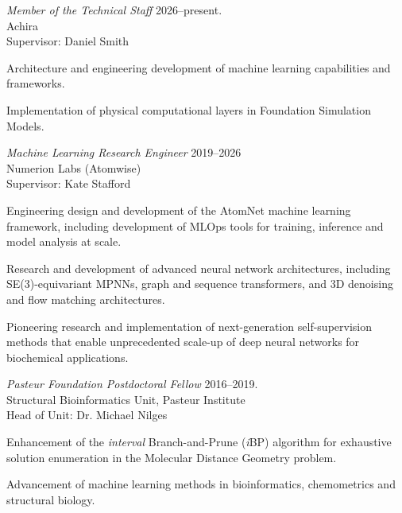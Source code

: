 \documentclass[letterpaper]{article}
\renewenvironment{itemize}{
  \begin{list}{}{
    \setlength{\leftmargin}{1.5em}
  }
}{
  \end{list}
}
\begin{document}
\begin{itemize}
\setlength{\itemsep}{16pt}
\item{
  {\it Member of the Technical Staff}
  \hfill 2026--present. \\
  Achira \\
  Supervisor: Daniel Smith \\
  \begin{enumerate*}
    \item Architecture and engineering development of machine learning
    capabilities and frameworks.
    \item Implementation of physical computational layers in Foundation
    Simulation Models.
  \end{enumerate*}
}

\pagebreak
\item{
  {\it Machine Learning Research Engineer}
  \hfill 2019--2026 \\
  Numerion Labs (Atomwise) \\
  Supervisor: Kate Stafford \\
  \begin{enumerate*}
    \item Engineering design and development of the AtomNet\textregistered{}
    machine learning framework, including development of MLOps tools for
    training, inference and model analysis at scale.
    \item Research and development of advanced neural network architectures,
    including SE(3)-equivariant MPNNs, graph and sequence transformers, and
    3D denoising and flow matching architectures.
    \item Pioneering research and implementation of next-generation
    self-supervision methods that enable unprecedented scale-up of deep
    neural networks for biochemical applications.
  \end{enumerate*}
}

\item{
  {\it Pasteur Foundation Postdoctoral Fellow}
  \hfill 2016--2019. \\
  Structural Bioinformatics Unit, Pasteur Institute \\
  Head of Unit: Dr. Michael Nilges \\
  \begin{enumerate*}
    \item Enhancement of the {\it interval} Branch-and-Prune
    ({\it i}BP) algorithm for exhaustive solution enumeration in the
    Molecular Distance Geometry problem.
    \item Advancement of machine learning methods in bioinformatics,
    chemometrics and structural biology.
  \end{enumerate*}
}


\end{itemize}
\end{document}
